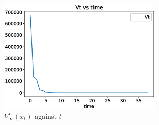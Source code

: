 \documentclass[a4paper,11pt,reqno]{amsart}
\begin{document}
\begin{figure}[H]
    \centering
    \includegraphics[width=0.7\textwidth]{figures/q3_iii.eps}
    \caption{$V^{\star}_{\infty}(x_t) $ against $t$}
    \label{fig:q3_iii}
\end{figure}

\end{document}
